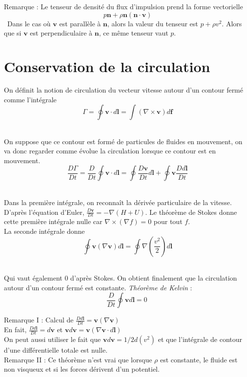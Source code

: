 \documentclass[10pt,a4paper]{book}
\begin{document}
Remarque : Le tenseur de densité du flux d'impulsion prend la forme vectorielle \[\  p\mathbf{n}+\rho\mathbf{n}(\mathbf{n\cdot v})\]\
Dans le cas où $\mathbf{v}$ est parallèle à $\mathbf{n}$, alors la valeur du tenseur est $p+\rho v^2$. Alors que si $\mathbf{v}$ est perpendiculaire à $\mathbf{n}$, ce même tenseur vaut $p$.

\section{Conservation de la circulation}

On définit la notion de circulation du vecteur vitesse autour d'un contour fermé comme l'intégrale \[\ \Gamma = \oint \mathbf{v\cdot}d\mathbf{l}=\int (\nabla\times\mathbf{v})d\mathbf{f}\]\

On suppose que ce contour est formé de particules de fluides en mouvement, on va donc regarder comme évolue la circulation lorsque ce contour est en mouvement. \[\ \frac{D \Gamma}{Dt}=\frac{D}{Dt}\oint \mathbf{v\cdot}d\mathbf{l} = \oint \frac{D\mathbf{v}}{Dt}d\mathbf{l}+ \oint\mathbf{v}\frac{Dd\mathbf{l}}{Dt} \]\

Dans la première intégrale, on reconnaît la dérivée particulaire de la vitesse. D'après l'équation d'Euler, $\frac{D\mathbf{v}}{Dt}=-\nabla(H+U)$. Le théorème de Stokes donne cette première intégrale nulle car $\nabla \times (\nabla f)=0$ pour tout $f$.\\

La seconde intégrale donne \[\ \oint\mathbf{v}(\nabla \mathbf{v})d\mathbf{l}=\oint\nabla(\frac{v^2}{2})d\mathbf{l}\]\

Qui vaut également 0 d'après Stokes. On obtient finalement que la circulation autour d'un contour fermé est constante. \emph{Théorème de Kelvin} : 
\begin{equation}
\frac{D}{Dt}\oint \mathbf{v}d\mathbf{l}=0
\end{equation}

Remarque I : Calcul de $\frac{Dd\mathbf{l}}{Dt}=\mathbf{v}(\nabla \mathbf{v})$\\
En fait, $\frac{Dd\mathbf{l}}{Dt}=d\mathbf{v}$ et $\mathbf{v}d\mathbf{v}=\mathbf{v}(\nabla \mathbf{v}\cdot d\mathbf{l})$\\
On peut aussi utiliser le fait que $\mathbf{v}d\mathbf{v}=1/2d(v^2)$ et que l'intégrale de contour d'une différentielle totale est nulle.\\

Remarque II : Ce théorème n'est vrai que lorsque $\rho$ est constante, le fluide est non visqueux et si les forces dérivent d'un potentiel.
\end{document}
